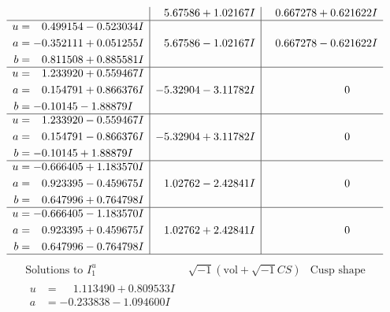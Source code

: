 \documentclass[1p]{elsarticle_modified}
\theoremstyle{definition}
\newcommand{\I}{\sqrt{-1}}
\begin{document}
$$\begin{array}{c|c|c}
 & \phantom{-}5.67586 + 1.02167 I & \phantom{-}0.667278 + 0.621622 I \\ \hline\begin{aligned}
u &= \phantom{-}0.499154 - 0.523034 I \\
a &= -0.352111 + 0.051255 I \\
b &= \phantom{-}0.811508 + 0.885581 I\end{aligned}
 & \phantom{-}5.67586 - 1.02167 I & \phantom{-}0.667278 - 0.621622 I \\ \hline\begin{aligned}
u &= \phantom{-}1.233920 + 0.559467 I \\
a &= \phantom{-}0.154791 + 0.866376 I \\
b &= -0.10145 - 1.88879 I\end{aligned}
 & -5.32904 - 3.11782 I & \phantom{-0.000000 } 0 \\ \hline\begin{aligned}
u &= \phantom{-}1.233920 - 0.559467 I \\
a &= \phantom{-}0.154791 - 0.866376 I \\
b &= -0.10145 + 1.88879 I\end{aligned}
 & -5.32904 + 3.11782 I & \phantom{-0.000000 } 0 \\ \hline\begin{aligned}
u &= -0.666405 + 1.183570 I \\
a &= \phantom{-}0.923395 - 0.459675 I \\
b &= \phantom{-}0.647996 + 0.764798 I\end{aligned}
 & \phantom{-}1.02762 - 2.42841 I & \phantom{-0.000000 } 0 \\ \hline\begin{aligned}
u &= -0.666405 - 1.183570 I \\
a &= \phantom{-}0.923395 + 0.459675 I \\
b &= \phantom{-}0.647996 - 0.764798 I\end{aligned}
 & \phantom{-}1.02762 + 2.42841 I & \phantom{-0.000000 } 0\\
 \hline 
 \end{array}$$\newpage$$\begin{array}{c|c|c}  
\text{Solutions to }I^u_{1}& \I (\text{vol} + \sqrt{-1}CS) & \text{Cusp shape}\\
 \hline 
\begin{aligned}
u &= \phantom{-}1.113490 + 0.809533 I \\
a &= -0.233838 - 1.094600 I \\

\end{aligned}
\end{array}$$
\end{document}
